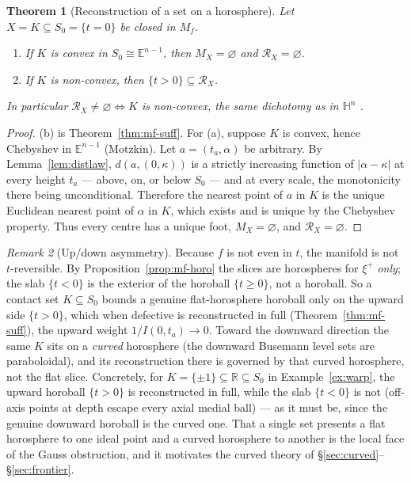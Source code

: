 \documentclass[11pt]{article}
\newtheorem{theorem}{Theorem}[section]
\theoremstyle{remark}
\newtheorem{remark}[theorem]{Remark}
\newcommand{\R}{\mathbb{R}}
\newcommand{\X}{X}
\newcommand{\Mx}{M_{\X}}
\newcommand{\Rx}{\mathcal{R}_{\X}}
\newcommand{\Sb}[1]{S_{#1}}
\newcommand{\Mf}{M_{f}}
\newcommand{\E}{\mathbb{E}}
\newcommand{\HH}{\mathbb{H}}
\begin{document}
\begin{theorem}[Reconstruction of a set on a horosphere]
\label{thm:mf-sharp}
Let $\X=K\subseteq\Sb{0}=\{t=0\}$ be closed in $\Mf$.
\begin{enumerate}[label=\textup{(\alph*)}]
\item If $K$ is convex in $\Sb{0}\cong\E^{n-1}$, then $\Mx=\varnothing$
  and $\Rx=\varnothing$.
\item If $K$ is non-convex, then $\{t>0\}\subseteq\Rx$.
\end{enumerate}
In particular $\Rx\neq\varnothing\iff K$ is non-convex, the same
dichotomy as in $\HH^{n}$ \textup{\cite[``$\X$ on a horosphere'']{R2}}.
\end{theorem}

\begin{proof}
(b) is Theorem~\ref{thm:mf-suff}. For (a), suppose $K$ is convex, hence
Chebyshev in $\E^{n-1}$ (Motzkin). Let $a=(t_{a},\alpha)$ be arbitrary.
By Lemma~\ref{lem:distlaw}, $d(a,(0,\kappa))$ is a strictly increasing
function of $|\alpha-\kappa|$ at every height $t_{a}$ --- above, on, or
below $\Sb{0}$ --- and at every scale, the monotonicity there being
unconditional. Therefore the nearest point of $a$ in $K$ is the unique
Euclidean nearest point of $\alpha$ in $K$, which exists and is unique
by the Chebyshev property. Thus every centre has a unique foot,
$\Mx=\varnothing$, and $\Rx=\varnothing$.
\end{proof}

\begin{remark}[Up/down asymmetry]\label{rem:asym}
Because $f$ is not even in $t$, the manifold is not $t$-reversible. By
Proposition~\ref{prop:mf-horo} the slices are horospheres for
$\xi^{+}$ \emph{only}; the slab $\{t<0\}$ is the exterior of the
horoball $\{t\ge0\}$, not a horoball. So a contact set
$K\subseteq\Sb{0}$ bounds a genuine flat-horosphere horoball only on
the upward side $\{t>0\}$, which when defective is reconstructed in
full (Theorem~\ref{thm:mf-suff}), the upward weight $1/I(0,t_{a})\to0$.
Toward the downward direction the same $K$ sits on a \emph{curved}
horosphere (the downward Busemann level sets are paraboloidal), and its
reconstruction there is governed by that curved horosphere, not the
flat slice. Concretely, for $K=\{\pm1\}\subseteq\R\subseteq\Sb{0}$ in
Example~\ref{ex:warp}, the upward horoball $\{t>0\}$ is reconstructed
in full, while the slab $\{t<0\}$ is not (off-axis points at depth
escape every axial medial ball) --- as it must be, since the genuine
downward horoball is the curved one. That a single set presents a flat
horosphere to one ideal point and a curved horosphere to another is the
local face of the Gauss obstruction, and it motivates the curved theory
of \S\ref{sec:curved}--\S\ref{sec:frontier}.
\end{remark}
\end{document}
